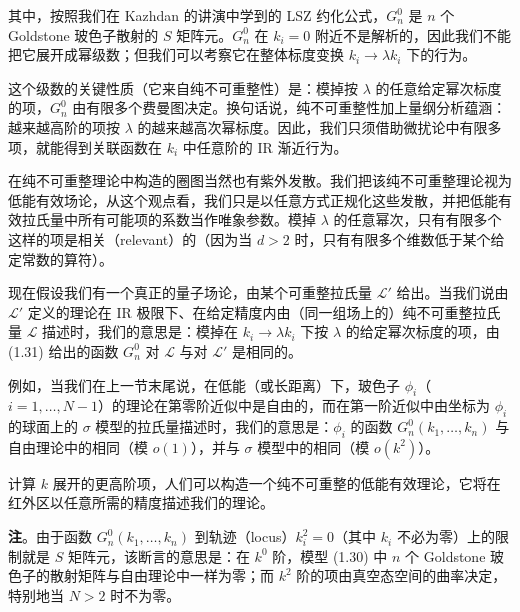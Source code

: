 其中，按照我们在 Kazhdan 的讲演中学到的 LSZ 约化公式，$G_n^0$ 是 $n$ 个 Goldstone 玻色子散射的 $S$ 矩阵元。$G_n^0$ 在 $k_i=0$ 附近不是解析的，因此我们不能把它展开成幂级数；但我们可以考察它在整体标度变换 $k_i\to\lambda k_i$ 下的行为。

这个级数的关键性质（它来自纯不可重整性）是：模掉按 $\lambda$ 的任意给定幂次标度的项，$G_n^0$ 由有限多个费曼图决定。换句话说，纯不可重整性加上量纲分析蕴涵：越来越高阶的项按 $\lambda$ 的越来越高次幂标度。因此，我们只须借助微扰论中有限多项，就能得到关联函数在 $k_i$ 中任意阶的 IR 渐近行为。


在纯不可重整理论中构造的圈图当然也有紫外发散。我们把该纯不可重整理论视为低能有效场论，从这个观点看，我们只是以任意方式正规化这些发散，并把低能有效拉氏量中所有可能项的系数当作唯象参数。模掉 $\lambda$ 的任意幂次，只有有限多个这样的项是相关（relevant）的（因为当 $d>2$ 时，只有有限多个维数低于某个给定常数的算符）。

现在假设我们有一个真正的量子场论，由某个可重整拉氏量 $\mathcal{L}'$ 给出。当我们说由 $\mathcal{L}'$ 定义的理论在 IR 极限下、在给定精度内由（同一组场上的）纯不可重整拉氏量 $\mathcal{L}$ 描述时，我们的意思是：模掉在 $k_i\to\lambda k_i$ 下按 $\lambda$ 的给定幂次标度的项，由 (1.31) 给出的函数 $G_n^0$ 对 $\mathcal{L}$ 与对 $\mathcal{L}'$ 是相同的。

例如，当我们在上一节末尾说，在低能（或长距离）下，玻色子 $\phi_i$（$i=1,\dots,N-1$）的理论在第零阶近似中是自由的，而在第一阶近似中由坐标为 $\phi_i$ 的球面上的 $\sigma$ 模型的拉氏量描述时，我们的意思是：$\phi_i$ 的函数 $G_n^0(k_1,\dots,k_n)$ 与自由理论中的相同（模 $o(1)$），并与 $\sigma$ 模型中的相同（模 $o(k^2)$）。

计算 $k$ 展开的更高阶项，人们可以构造一个纯不可重整的低能有效理论，它将在红外区以任意所需的精度描述我们的理论。

\noindent\textbf{注}。由于函数 $G_n^0(k_1,\dots,k_n)$ 到轨迹（locus）$k_i^2=0$（其中 $k_i$ 不必为零）上的限制就是 $S$ 矩阵元，该断言的意思是：在 $k^0$ 阶，模型 (1.30) 中 $n$ 个 Goldstone 玻色子的散射矩阵与自由理论中一样为零；而 $k^2$ 阶的项由真空态空间的曲率决定，特别地当 $N>2$ 时不为零。

